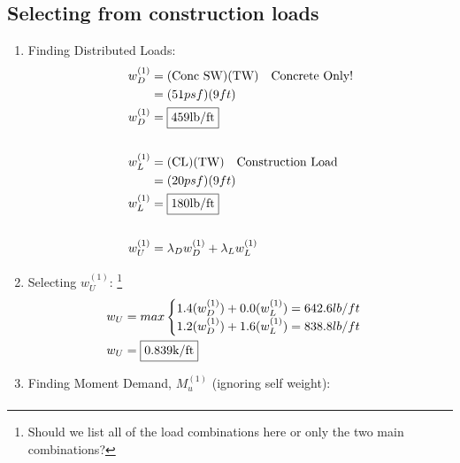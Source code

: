 \documentclass{report} %
\begin{document}
\subsection*{Selecting from construction loads}
\begin{enumerate}
    \item Finding Distributed Loads:
        \begin{equation*}
            \begin{aligned}
                w^{(1)}_D &= (\text{Conc SW}) (\text{TW}) \quad \text{Concrete Only!}\\
                          &= (51psf)(9ft) \\
                w^{(1)}_D &= \framebox{459lb/ft} \\
                \\
                w^{(1)}_L &= (\text{CL}) (\text{TW}) \quad \text{Construction Load}\\
                          &= (20psf)(9ft) \\
                w^{(1)}_L &= \framebox{180lb/ft} \\
                \\
                w^{(1)}_U &= \lambda _D w^{(1)}_D + \lambda _L w^{(1)}_L \\
            \end{aligned}
        \end{equation*}
    \item Selecting $w^{(1)}_U$: \footnote{Should we list all of the load combinations here or only the two main combinations?} 
        \begin{equation*}
            \begin{aligned}
                w_U &= max
                    \begin{cases}
                        1.4(w^{(1)}_D) + 0.0(w^{(1)}_L) = 642.6lb/ft \\
                        1.2(w^{(1)}_D) + 1.6(w^{(1)}_L) = 838.8lb/ft \\
                    \end{cases} \\
                w_U &= \framebox{0.839k/ft}
            \end{aligned}
        \end{equation*}
    \item Finding Moment Demand, $M^{(1)}_u$ (ignoring self weight):
        \begin{equation*}
            \begin{aligned}

\end{aligned}
\end{equation*}
\end{enumerate}
\end{document}
